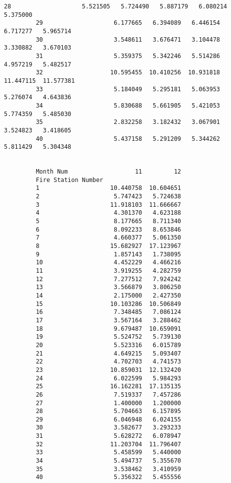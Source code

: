 \documentclass[11pt]{article}
\begin{document}
\begin{Verbatim}[commandchars=\\\{\}]
         28                    5.521505   5.724490   5.887179   6.080214   5.375000   
         29                    6.177665   6.394089   6.446154   6.717277   5.965714   
         30                    3.548611   3.676471   3.104478   3.330882   3.670103   
         31                    5.359375   5.342246   5.514286   4.957219   5.482517   
         32                   10.595455  10.410256  10.931818  11.447115  11.577381   
         33                    5.184049   5.295181   5.063953   5.276074   4.643836   
         34                    5.830688   5.661905   5.421053   5.774359   5.485030   
         35                    2.832258   3.182432   3.067901   3.524823   3.418605   
         40                    5.437158   5.291209   5.344262   5.811429   5.304348   
         
                                                    
         Month Num                   11         12  
         Fire Station Number                        
         1                    10.440758  10.604651  
         2                     5.747423   5.724638  
         3                    11.918103  11.666667  
         4                     4.301370   4.623188  
         5                     8.177665   8.711340  
         6                     8.092233   8.653846  
         7                     4.660377   5.061350  
         8                    15.682927  17.123967  
         9                     1.857143   1.738095  
         10                    4.452229   4.466216  
         11                    3.919255   4.282759  
         12                    7.277512   7.924242  
         13                    3.566879   3.806250  
         14                    2.175000   2.427350  
         15                   10.103286  10.506849  
         16                    7.348485   7.086124  
         17                    3.567164   3.288462  
         18                    9.679487  10.659091  
         19                    5.524752   5.739130  
         20                    5.523316   6.015789  
         21                    4.649215   5.093407  
         22                    4.702703   4.741573  
         23                   10.859031  12.132420  
         24                    6.022599   5.984293  
         25                   16.162281  17.135135  
         26                    7.519337   7.457286  
         27                    1.400000   1.200000  
         28                    5.704663   6.157895  
         29                    6.046948   6.024155  
         30                    3.582677   3.293233  
         31                    5.628272   6.078947  
         32                   11.203704  11.796407  
         33                    5.458599   5.440000  
         34                    5.494737   5.355670  
         35                    3.538462   3.410959  
         40                    5.356322   5.455556  
\end{Verbatim}
            
\end{document}
